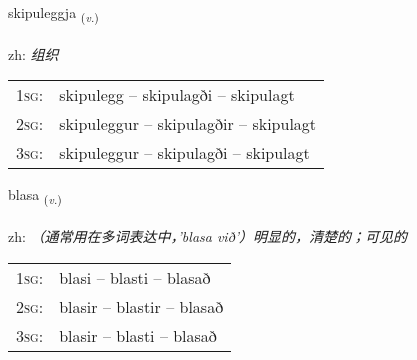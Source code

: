 \documentclass[frontgrid, backgrid]{flacards}\usepackage[]{graphicx}\usepackage[]{color}
\begin{document}
\renewcommand{\flhead}{\vskip5pt \fboxsep=0pt {\small\bfseries\footnotesize Sagnorð | 动词}}
\renewcommand{\fcfoot}{\vskip5pt \fboxsep=0pt \hspace{2pt}{\small\bfseries\footnotesize 2K}}

\renewcommand{\blhead}{\vskip5pt {\small\bfseries\footnotesize Sagnorð | 动词 }}
\renewcommand{\bcfoot}{\vskip5pt \hspace{2pt}{\small\bfseries\footnotesize 2K}}


{skipuleggja \small{\textsubscript{(\textit{v.})}} \\[1ex] %
\textphonetic{[scɪːpʏlɛca]} \\
zh: \emph{组织} \\  [2ex]
\renewcommand*{\arraystretch}{0.8}
\begin{tabular}{p{1cm}l}
\textsc{1sg}: & skipulegg -- skipulagði -- skipulagt \\ 
\textsc{2sg}: & skipuleggur -- skipulagðir -- skipulagt \\ 
\textsc{3sg}: & skipuleggur -- skipulagði -- skipulagt \\ 
\end{tabular}
}

\renewcommand{\flhead}{\vskip5pt \fboxsep=0pt {\small\bfseries\footnotesize Sagnorð | 动词}}
\renewcommand{\fcfoot}{\vskip5pt \fboxsep=0pt \hspace{2pt}{\small\bfseries\footnotesize 2K}}

\renewcommand{\blhead}{\vskip5pt {\small\bfseries\footnotesize Sagnorð | 动词 }}
\renewcommand{\bcfoot}{\vskip5pt \hspace{2pt}{\small\bfseries\footnotesize 2K}}


{blasa \small{\textsubscript{(\textit{v.})}} \\[1ex] %
\textphonetic{[plaːsa]} \\
zh: \emph{（通常用在多词表达中，'blasa við'）明显的，清楚的；可见的} \\  [2ex]
\renewcommand*{\arraystretch}{0.8}
\begin{tabular}{p{1cm}l}
\textsc{1sg}: & blasi -- blasti -- blasað \\ 
\textsc{2sg}: & blasir -- blastir -- blasað \\ 
\textsc{3sg}: & blasir -- blasti -- blasað \\ 
\end{tabular}
}
\end{document}
